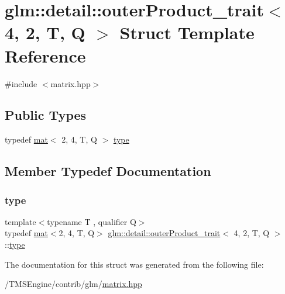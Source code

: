 \hypertarget{structglm_1_1detail_1_1outer_product__trait_3_014_00_012_00_01_t_00_01_q_01_4}{}\section{glm\+:\+:detail\+:\+:outer\+Product\+\_\+trait$<$ 4, 2, T, Q $>$ Struct Template Reference}
\label{structglm_1_1detail_1_1outer_product__trait_3_014_00_012_00_01_t_00_01_q_01_4}


{\ttfamily \#include $<$matrix.\+hpp$>$}

\subsection*{Public Types}
\begin{DoxyCompactItemize}
\item 
typedef \hyperlink{structglm_1_1mat}{mat}$<$ 2, 4, T, Q $>$ \hyperlink{structglm_1_1detail_1_1outer_product__trait_3_014_00_012_00_01_t_00_01_q_01_4_a147defb160b17d4193e19a64618c035e}{type}
\end{DoxyCompactItemize}


\subsection{Member Typedef Documentation}
\mbox{\label{structglm_1_1detail_1_1outer_product__trait_3_014_00_012_00_01_t_00_01_q_01_4_a147defb160b17d4193e19a64618c035e}} 
\subsubsection{\texorpdfstring{type}{type}}
{\footnotesize\ttfamily template$<$typename T , qualifier Q$>$ \\
typedef \hyperlink{structglm_1_1mat}{mat}$<$2, 4, T, Q$>$ \hyperlink{structglm_1_1detail_1_1outer_product__trait}{glm\+::detail\+::outer\+Product\+\_\+trait}$<$ 4, 2, T, Q $>$\+::\hyperlink{structglm_1_1detail_1_1outer_product__trait_3_014_00_012_00_01_t_00_01_q_01_4_a147defb160b17d4193e19a64618c035e}{type}}



The documentation for this struct was generated from the following file\+:\begin{DoxyCompactItemize}
\item 
/\+T\+M\+S\+Engine/contrib/glm/\hyperlink{matrix_8hpp}{matrix.\+hpp}\end{DoxyCompactItemize}
